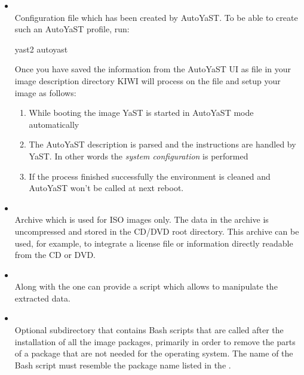 \begin{itemize}
\item {}\\
      Configuration file which has been created by AutoYaST.
      To be able to create such an AutoYaST profile, run:

\begin{Command}{8cm}
yast2 autoyast
\end{Command}

      Once you have saved the information from the AutoYaST UI as
       file in your image description directory KIWI
      will process on the file and setup your image as follows:
      \begin{enumerate}
      \item While booting the image YaST is started in AutoYaST mode
            automatically
      \item The AutoYaST description is parsed and the instructions are
            handled by YaST. In other words the \emph{system configuration}
            is performed
      \item If the process finished successfully the environment is
            cleaned and AutoYaST won't be called at next reboot.
      \end{enumerate}

\item {}\\
      Archive which is used for ISO images only. The data in the archive is
      uncompressed and stored in the CD/DVD root directory. This
      archive can be used, for example, to integrate a license file or
      information directly readable from the CD or DVD.

\item {}\\
      Along with the  one can provide a script which allows
      to manipulate the extracted data.

\item {}\\
      Optional subdirectory that contains Bash scripts that are called
      after the installation of all the image packages, primarily in order
      to remove the parts of a package that are not needed for the operating
      system. The name of the Bash script must resemble the package name
      listed in the .
\end{itemize}

